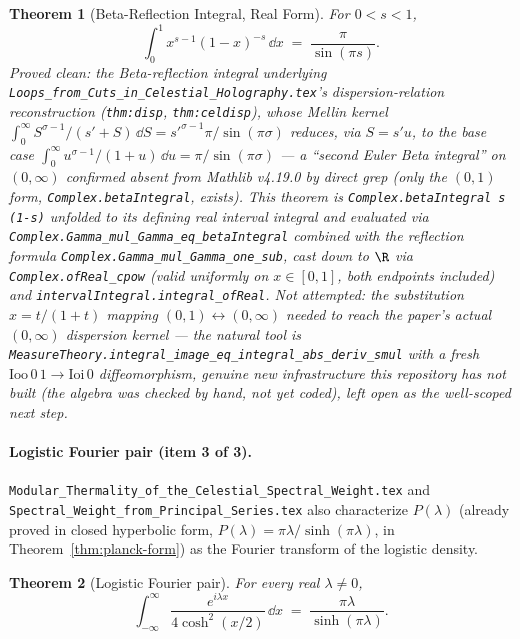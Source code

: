 \documentclass{report}
\newtheorem{theorem}{Theorem}[chapter]
\theoremstyle{definition}
\begin{document}
\begin{theorem}[Beta-Reflection Integral, Real Form]
  \label{thm:beta-reflection-real}
  \leanok
  For $0<s<1$,
  \[
    \int_0^1 x^{s-1}(1-x)^{-s}\,\dd x \;=\; \frac{\pi}{\sin(\pi s)}.
  \]
  \emph{Proved clean}: the Beta-reflection integral underlying
  \texttt{Loops\_from\_Cuts\_in\_Celestial\_Holography.tex}'s dispersion-relation
  reconstruction (\texttt{thm:disp}, \texttt{thm:celdisp}), whose Mellin kernel
  $\int_0^\infty S^{\sigma-1}/(s'{+}S)\,\dd S = s'^{\sigma-1}\pi/\sin(\pi\sigma)$ reduces, via
  $S=s'u$, to the base case $\int_0^\infty u^{\sigma-1}/(1{+}u)\,\dd u=\pi/\sin(\pi\sigma)$ ---
  a ``second Euler Beta integral'' on $(0,\infty)$ confirmed absent from Mathlib v4.19.0 by
  direct grep (only the $(0,1)$ form, \texttt{Complex.betaIntegral}, exists). This theorem is
  \texttt{Complex.betaIntegral s (1-s)} unfolded to its defining real interval integral and
  evaluated via \texttt{Complex.Gamma\_mul\_Gamma\_eq\_betaIntegral} combined with the
  reflection formula \texttt{Complex.Gamma\_mul\_Gamma\_one\_sub}, cast down to $\R$ via
  \texttt{Complex.ofReal\_cpow} (valid uniformly on $x\in[0,1]$, both endpoints included) and
  \texttt{intervalIntegral.integral\_ofReal}.
  \emph{Not attempted}: the substitution $x=t/(1{+}t)$ mapping $(0,1)\leftrightarrow(0,\infty)$
  needed to reach the paper's actual $(0,\infty)$ dispersion kernel --- the natural tool is
  \texttt{MeasureTheory.integral\_image\_eq\_integral\_abs\_deriv\_smul} with a fresh
  $\mathrm{Ioo}\,0\,1\to\mathrm{Ioi}\,0$ diffeomorphism, genuine new infrastructure this
  repository has not built (the algebra was checked by hand, not yet coded), left open as the
  well-scoped next step.
\end{theorem}

\paragraph{Logistic Fourier pair (item 3 of 3).}
\texttt{Modular\_Thermality\_of\_the\_Celestial\_Spectral\_Weight.tex} and
\texttt{Spectral\_Weight\_from\_Principal\_Series.tex} also characterize $P(\lambda)$ (already
proved in closed hyperbolic form, $P(\lambda)=\pi\lambda/\sinh(\pi\lambda)$, in
Theorem~\ref{thm:planck-form}) as the Fourier transform of the logistic density.

\begin{theorem}[Logistic Fourier pair]
  \label{thm:logistic-fourier-pair}
  \leanok
  For every real $\lambda \neq 0$,
  \[
    \int_{-\infty}^{\infty} \frac{e^{i\lambda x}}{4\cosh^2(x/2)}\,\dd x
    \;=\; \frac{\pi\lambda}{\sinh(\pi\lambda)} .
  \]
\end{theorem}
\end{document}
